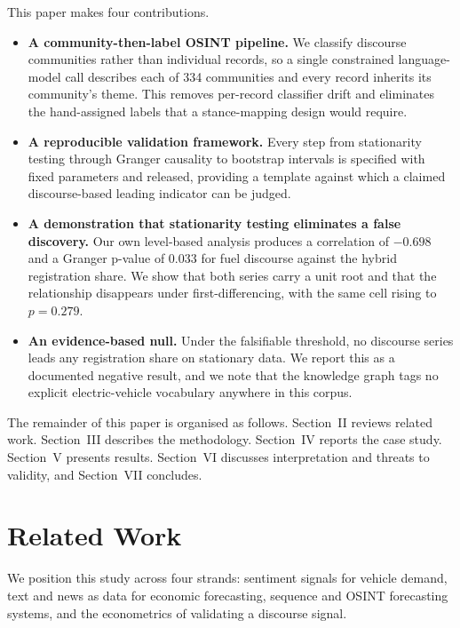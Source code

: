 \documentclass[conference]{IEEEtran}
\begin{document}
This paper makes four contributions.
\begin{itemize}
\item \textbf{A community-then-label OSINT pipeline.} We classify discourse
communities rather than individual records, so a single constrained
language-model call describes each of 334 communities and every record inherits
its community's theme. This removes per-record classifier drift and eliminates
the hand-assigned labels that a stance-mapping design would require.
\item \textbf{A reproducible validation framework.} Every step from stationarity
testing through Granger causality to bootstrap intervals is specified with fixed
parameters and released, providing a template against which a claimed
discourse-based leading indicator can be judged.
\item \textbf{A demonstration that stationarity testing eliminates a false
discovery.} Our own level-based analysis produces a correlation of $-0.698$ and
a Granger p-value of 0.033 for fuel discourse against the hybrid registration
share. We show that both series carry a unit root and that the relationship
disappears under first-differencing, with the same cell rising to $p=0.279$.
\item \textbf{An evidence-based null.} Under the falsifiable
threshold, no discourse series leads any registration share on stationary data.
We report this as a documented negative result, and we note that the knowledge
graph tags no explicit electric-vehicle vocabulary anywhere in this corpus.
\end{itemize}

The remainder of this paper is organised as follows. Section~II reviews related
work. Section~III describes the methodology. Section~IV reports the case study.
Section~V presents results. Section~VI discusses interpretation and threats to
validity, and Section~VII concludes.

\section{Related Work}
We position this study across four strands: sentiment signals for vehicle
demand, text and news as data for economic forecasting, sequence and OSINT
forecasting systems, and the econometrics of validating a discourse signal.
\end{document}
